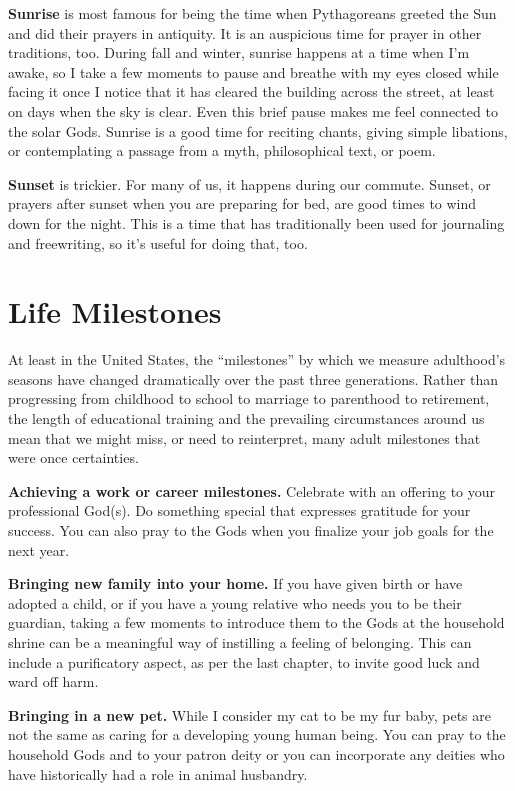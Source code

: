 \documentclass[
]{book}
\begin{document}
\textbf{Sunrise} is most famous for being the time when Pythagoreans greeted the Sun and did their prayers in antiquity. It is an auspicious time for prayer in other traditions, too. During fall and winter, sunrise happens at a time when I'm awake, so I take a few moments to pause and breathe with my eyes closed while facing it once I notice that it has cleared the building across the street, at least on days when the sky is clear. Even this brief pause makes me feel connected to the solar Gods. Sunrise is a good time for reciting chants, giving simple libations, or contemplating a passage from a myth, philosophical text, or poem.

\textbf{Sunset} is trickier. For many of us, it happens during our commute. Sunset, or prayers after sunset when you are preparing for bed, are good times to wind down for the night. This is a time that has traditionally been used for journaling and freewriting, so it's useful for doing that, too.

\hypertarget{life-milestones}{%
\section{Life Milestones}\label{life-milestones}}

At least in the United States, the ``milestones'' by which we measure adulthood's seasons have changed dramatically over the past three generations. Rather than progressing from childhood to school to marriage to parenthood to retirement, the length of educational training and the prevailing circumstances around us mean that we might miss, or need to reinterpret, many adult milestones that were once certainties.

\textbf{Achieving a work or career milestones.} Celebrate with an offering to your professional God(s). Do something special that expresses gratitude for your success. You can also pray to the Gods when you finalize your job goals for the next year.

\textbf{Bringing new family into your home.} If you have given birth or have adopted a child, or if you have a young relative who needs you to be their guardian, taking a few moments to introduce them to the Gods at the household shrine can be a meaningful way of instilling a feeling of belonging. This can include a purificatory aspect, as per the last chapter, to invite good luck and ward off harm.

\textbf{Bringing in a new pet.} While I consider my cat to be my fur baby, pets are not the same as caring for a developing young human being. You can pray to the household Gods and to your patron deity or you can incorporate any deities who have historically had a role in animal husbandry.
\end{document}
